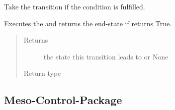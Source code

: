 \documentclass[a4paper,12pt,twoside]{article}
\begin{document}
\begin{fulllineitems}
\begin{fulllineitems}
\begin{quote}
\begin{description}
\end{description}\end{quote}

\end{fulllineitems}


\begin{fulllineitems}
\label{\detokenize{osbk_operation:osbk_operation.utility.Transition.take}}
Take the transition if the condition is fulfilled.

Executes the  and returns the end-state if  returns True.
\begin{quote}\begin{description}
\item[{Returns}] \leavevmode
the state this transition leads to or None

\item[{Return type}] \leavevmode
{\hyperref[\detokenize{osbk_operation:osbk_operation.utility.State}]{}}

\end{description}\end{quote}

\end{fulllineitems}


\end{fulllineitems}


\clearpage
\subsection{Meso-Control-Package}
\label{\detokenize{meso_control_pkg:module-meso_control_pkg.meso_state_machine}}\label{\detokenize{meso_control_pkg:meso-control-package}}\label{\detokenize{meso_control_pkg::doc}}
\end{document}
